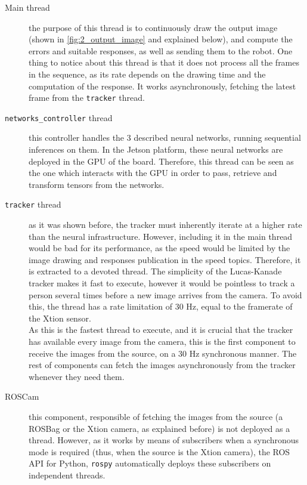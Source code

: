 \begin{description}
	\item[Main thread] the purpose of this thread is to continuously draw the output image (shown in \autoref{fig:2_output_image} and explained below), and compute the errors and suitable responses, as well as sending them to the robot. One thing to notice about this thread is that it does not process all the frames in the sequence, as its rate depends on the drawing time and the computation of the response. It works asynchronously, fetching the latest frame from the \texttt{tracker} thread.
	
	\item[\texttt{networks\_controller} thread] this controller handles the 3 described neural networks, running sequential inferences on them. In the Jetson platform, these neural networks are deployed in the GPU of the board. Therefore, this thread can be seen as the one which interacts with the GPU in order to pass, retrieve and transform tensors from the networks.
	
	\item[\texttt{tracker} thread] as it was shown before, the tracker must inherently iterate at a higher rate than the neural infrastructure. However, including it in the main thread would be bad for its performance, as the speed would be limited by the image drawing and responses publication in the speed topics. Therefore, it is extracted to a devoted thread. The simplicity of the Lucas-Kanade tracker makes it fast to execute, however it would be pointless to track a person several times before a new image arrives from the camera. To avoid this, the thread has a rate limitation of 30 Hz, equal to the framerate of the Xtion sensor.\\
	
	As this is the fastest thread to execute, and it is crucial that the tracker has available every image from the camera, this is the first component to receive the images from the source, on a 30 Hz synchronous manner. The rest of components can fetch the images asynchronously from the tracker whenever they need them.
	
	\item[ROSCam] this component, responsible of fetching the images from the source (a ROSBag or the Xtion camera, as explained before) is not deployed as a thread. However, as it works by means of subscribers when a synchronous mode is required (thus, when the source is the Xtion camera), the ROS API for Python, \texttt{rospy} automatically deploys these subscribers on independent threads.
\end{description}

